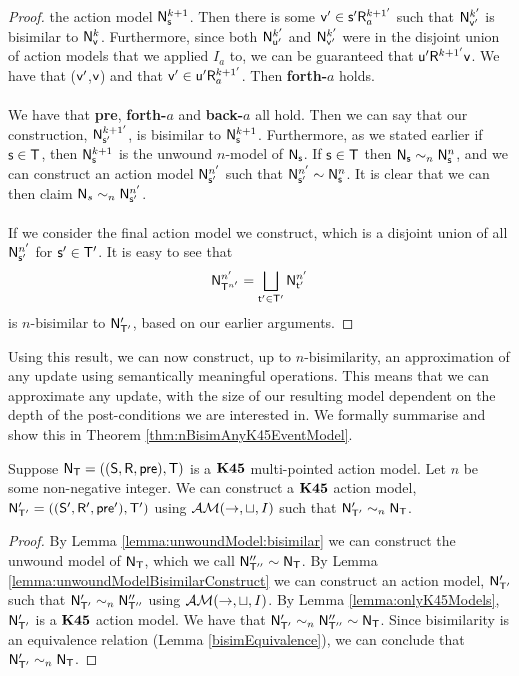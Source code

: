 \begin{proof}
	the action model $\evM^{k+1}_\evs$.
	Then there is some $\evv' \in \evs' \evR^{k+1'}_a$ such that $\evM^{k'}_{\evv'}$ is bisimilar to
	$\evM^{k}_\evv$.
	Furthermore, since both $\evM^{k'}_{\evu'}$ and $\evM^{k'}_{\evv'}$ were in the disjoint union of action models
	that we applied $I_a$ to, we can be guaranteed that $\evu' \evR^{k+1'} \evv$.
	We have that ($\evv'$,$\evv$) and that $\evv' \in \evu' \evR^{k+1'}_a$.
	Then {\bf forth-$a$} holds.\\
	\\
	We have that {\bf pre}, {\bf forth-$a$} and {\bf back-$a$} all hold.
	Then we can say that our construction, $\evM^{k+1'}_{\evs'}$, is bisimilar to $\evM^{k+1}_\evs$.
	Furthermore, as we stated earlier if $\evs \in \evT$, then $\evM^{k+1}_\evs$ is the unwound
	$n$-model of $\evM_\evs$.
	If $\evs \in \evT$ then $\evM_\evs \sim_n \evM^{n}_\evs$, and we can construct an action model
	$\evM^{n'}_{\evs'}$ such that $\evM^{n'}_{\evs'} \sim \evM^{n}_\evs$.
	It is clear that we can then claim $\evM_s \sim_n \evM^{n'}_{\evs'}$.\\
	\\
	If we consider the final action model we construct, which is a disjoint union of all
	$\evM^{n'}_{\evs'}$ for $\evs' \in \evT'$.
	It is easy to see that
	\[
		\evM^{n'}_{\evT^{n'}} = \bigsqcup_{\evt' \in \evT'} \evM^{n'}_{\evt'}
	\]
	is $n$-bisimilar to $\evM'_{\evT'}$, based on our earlier arguments.
\end{proof}

Using this result, we can now construct, up to $n$-bisimilarity, an
approximation of any update using semantically meaningful operations.
This means that we can approximate any update, with the size of our resulting
model dependent on the depth of the post-conditions we are interested in.
We formally summarise and show this in Theorem
\ref{thm:nBisimAnyK45EventModel}.

\begin{thm} \label{thm:nBisimAnyK45EventModel}
  Suppose $\evM_\evT = ((\evS,\evR,\evpr),\evT)$ is a $\AXKFF$ multi-pointed
  action model.
  Let $n$ be some non-negative integer.
  We can construct a $\AXKFF$ action model, $\evM'_{\evT'} =
  ((\evS',\evR',\evpr'),\evT')$ using
  $\EM(\to,\sqcup,I)$ such that $\evM'_{\evT'} \sim_n \evM_\evT$.
\end{thm}
\begin{proof}
  By Lemma \ref{lemma:unwoundModel:bisimilar} we can construct the unwound model
  of $\evM_\evT$, which we call $\evM''_{\evT''} \sim \evM_{\evT}$.
	By Lemma \ref{lemma:unwoundModelBisimilarConstruct} we can construct an action model, $\evM'_{\evT'}$ such that
  $\evM'_{\evT'} \sim_n \evM''_{\evT''}$ using $\EM(\to,\sqcup,I)$.
  By Lemma \ref{lemma:onlyK45Models}, $\evM'_{\evT'}$ is a $\AXKFF$ action model.
  We have that $\evM'_{\evT'} \sim_n \evM''_{\evT''} \sim \evM_\evT$.
	Since bisimilarity is an equivalence relation (Lemma \ref{bisimEquivalence}), we can conclude that
  $\evM'_{\evT'} \sim_n \evM_\evT$.
\end{proof}

